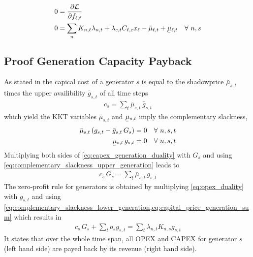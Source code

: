 \documentclass[11pt,twocolumn]{article}
\newcommand{\ubar}[1]{\underaccent{\bar}{#1}}
\newcommand{\Forall}[1]{\hspace{10pt} \forall \,\, #1 }
\newcommand{\pdv}[2]{\frac{\partial #1}{\partial #2}}
\newcommand{\generation}{g_{s,t}}
\newcommand{\generationpotential}{\bar{g}_{s,t}}
\newcommand{\capacitygeneration}{G_{s}}
\newcommand{\operationalpricegeneration}{o_{s}}
\newcommand{\capitalpricegeneration}{c_{s}}
\newcommand{\mulowergeneration}{\ubar{\mu}_{s,t}}
\newcommand{\muuppergeneration}{\bar{\mu}_{s,t}}
\newcommand{\flow}{f_{\ell,t}}
\newcommand{\mulowerflow}{\ubar{\mu}_{\ell,t}}
\newcommand{\muupperflow}{\bar{\mu}_{\ell,t}}
\newcommand{\lagrangian}{\mathcal{L}}
\newcommand{\lmp}[1][n]{\lambda_{#1,t}}
\newcommand{\incidence}[1][n]{K_{#1,\ell}}
\newcommand{\incidencegenerator}[1][n]{K_{#1,s}}
\newcommand{\cycle}{C_{\ell,c}}
\newcommand{\impedance}{x_\ell}
\newcommand{\cycleprice}{\lambda_{c,t}}
\begin{document}
\begin{align}
0 &= \pdv{\lagrangian}{\flow}  \\ 
0 &= \sum_n \incidence \lmp  + \cycleprice \cycle \impedance  - \muupperflow + \mulowerflow \Forall{n,s} \label{eq:opex_flow_duality}
\end{align}



\subsection{Proof Generation Capacity Payback}
\label{sec:zero_profit_generation}

As stated in \cite{brown_decreasing_2020} the capical cost of a generator $s$ is equal to the shadowprice $\muuppergeneration$ times the upper availibility $\generationpotential$ of all time steps 
\begin{align}
 \capitalpricegeneration  = \sum_t \muuppergeneration \, \generationpotential 
 \label{eq:capital_price_generation_sum}
\end{align}
 which yield the KKT variables $\muuppergeneration$ and $\mulowergeneration$ imply the complementary slackness,
\begin{align}
\muuppergeneration \left( \generation - \generationpotential \, \capacitygeneration \right)  &= 0  \Forall{n,s,t} 
\label{eq:complementary_slackness_upper_generation} \\
\mulowergeneration  \, \generation &= 0 \Forall{n,s,t}
\label{eq:complementary_slackness_lower_generation} 
\end{align}
Multiplying both sides of \cref{eq:capex_generation_duality} with $\capacitygeneration$ and using \cref{eq:complementary_slackness_upper_generation} leads to 
\begin{align}
 \capitalpricegeneration \, \capacitygeneration  = \sum_t \muuppergeneration \, \generation 
 \label{eq:capital_price_generation_sum}
\end{align}
The zero-profit rule for generators is obtained by multiplying \cref{eq:opex_duality} with $\generation$ and using \cref{eq:complementary_slackness_lower_generation,eq:capital_price_generation_sum} which results in 
\begin{align}
  \capitalpricegeneration \, \capacitygeneration + \sum_t \operationalpricegeneration \generation = \sum_t \lmp \incidencegenerator \generation
\end{align}
It states that over the whole time span, all OPEX and CAPEX for generator $s$ (left hand side) are payed back by its revenue (right hand side).
\end{document}
